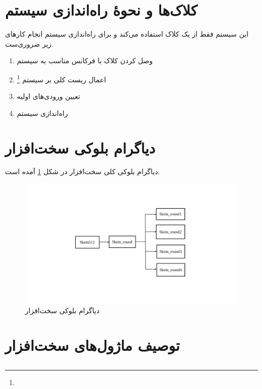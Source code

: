 \section{کلاک‌ها و نحوهٔ راه‌اندازی سیستم}
این سیستم فقط از یک کلاک استفاده می‌کند و برای راه‌اندازی سیستم انجام کارهای زیر ضروری‌ست.
\begin{enumerate}
	\item
	      وصل کردن کلاک با فرکانس مناسب به سیستم
	\item
	      اعمال ریست‌ کلی بر سیستم
	      \footnote{}
	\item 
	      تعیین ورودی‌های اولیه 
	\item 
	      راه‌اندازی سیستم 
\end{enumerate}


\section{دیاگرام بلوکی سخت‌افزار}
دیاگرام بلوکی کلی سخت‌افزار در شکل 
\ref{block_diagram}
آمده است. 

\begin{figure}
	\includegraphics[width = \textwidth]{figs/DescriptionOfSystem/block_diagram.jpg}
	\caption{دیاگرام بلوکی سخت‌افزار}
	\label{block_diagram}
\end{figure}

\section{توصیف ماژول‌های سخت‌افزار}
\subsection{}
